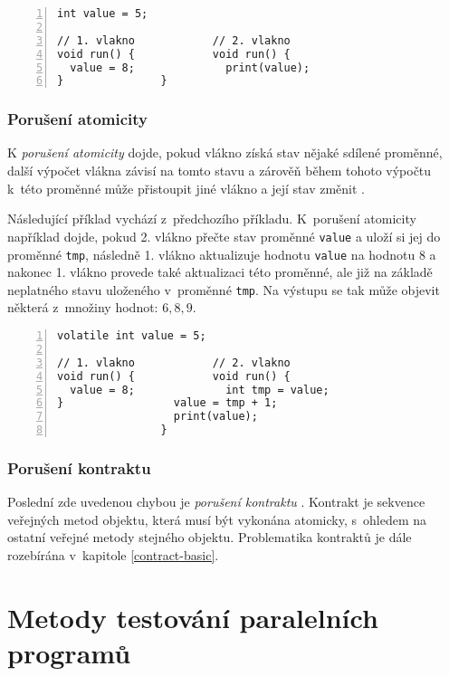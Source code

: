 \begin{lstlisting}[caption=Pseudokód příkladu časově závislé chyby nad daty., label={c:race}, frame=none, numbers=left, xleftmargin=1cm]
int value = 5;

// 1. vlakno			// 2. vlakno
void run() {			void run() {
  value = 8;			  print(value);
}				}
\end{lstlisting}

\subsection{Porušení atomicity}%
K \textit{porušení atomicity} dojde, pokud vlákno získá stav nějaké sdílené proměnné, další výpočet vlákna závisí na tomto stavu a zárověň během tohoto výpočtu k~této proměnné může přistoupit jiné vlákno a její stav změnit \cite{cite:OS2}.

Následující příklad vychází z~předchozího příkladu. K~porušení atomicity například dojde, pokud 2. vlákno přečte stav proměnné \texttt{value} a uloží si jej do proměnné \texttt{tmp}, následně 1. vlákno aktualizuje hodnotu \texttt{value} na hodnotu 8 a nakonec 1. vlákno provede také aktualizaci této proměnné, ale již na základě neplatného stavu uloženého v~proměnné \texttt{tmp}. Na výstupu se tak může objevit některá z~množiny hodnot: ${6, 8, 9}$.
\begin{lstlisting}[caption=Pseudokód porušení atomicity., frame=none, numbers=left, xleftmargin=1cm]
volatile int value = 5;

// 1. vlakno			// 2. vlakno
void run() {			void run() {
  value = 8;			  int tmp = value;
}				  value = tmp + 1;
				  print(value);
				}			
\end{lstlisting}

\subsection{Porušení kontraktu}

Poslední zde uvedenou chybou je \textit{porušení kontraktu} \cite{cite:contract0}. Kontrakt je sekvence veřejných metod objektu, která musí být vykonána atomicky, s~ohledem na ostatní veřejné metody stejného objektu. Problematika kontraktů je dále rozebírána v~kapitole \ref{contract-basic}.

\chapter{Metody testování paralelních programů}


